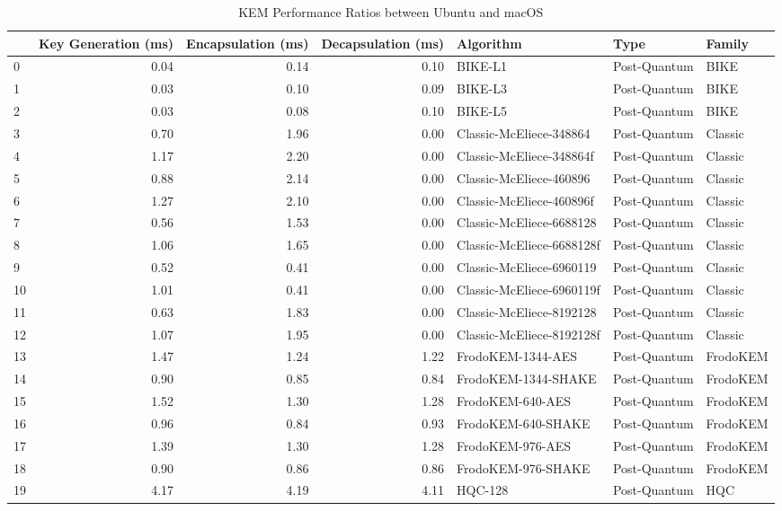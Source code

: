 \begin{table}
\caption{KEM Performance Ratios between Ubuntu and macOS}
\label{tab:desktop_kem_ratio}
\begin{tabular}{lrrrlll}
\toprule
 & Key Generation (ms) & Encapsulation (ms) & Decapsulation (ms) & Algorithm & Type & Family \\
\midrule
0 & 0.04 & 0.14 & 0.10 & BIKE-L1 & Post-Quantum & BIKE \\
1 & 0.03 & 0.10 & 0.09 & BIKE-L3 & Post-Quantum & BIKE \\
2 & 0.03 & 0.08 & 0.10 & BIKE-L5 & Post-Quantum & BIKE \\
3 & 0.70 & 1.96 & 0.00 & Classic-McEliece-348864 & Post-Quantum & Classic \\
4 & 1.17 & 2.20 & 0.00 & Classic-McEliece-348864f & Post-Quantum & Classic \\
5 & 0.88 & 2.14 & 0.00 & Classic-McEliece-460896 & Post-Quantum & Classic \\
6 & 1.27 & 2.10 & 0.00 & Classic-McEliece-460896f & Post-Quantum & Classic \\
7 & 0.56 & 1.53 & 0.00 & Classic-McEliece-6688128 & Post-Quantum & Classic \\
8 & 1.06 & 1.65 & 0.00 & Classic-McEliece-6688128f & Post-Quantum & Classic \\
9 & 0.52 & 0.41 & 0.00 & Classic-McEliece-6960119 & Post-Quantum & Classic \\
10 & 1.01 & 0.41 & 0.00 & Classic-McEliece-6960119f & Post-Quantum & Classic \\
11 & 0.63 & 1.83 & 0.00 & Classic-McEliece-8192128 & Post-Quantum & Classic \\
12 & 1.07 & 1.95 & 0.00 & Classic-McEliece-8192128f & Post-Quantum & Classic \\
13 & 1.47 & 1.24 & 1.22 & FrodoKEM-1344-AES & Post-Quantum & FrodoKEM \\
14 & 0.90 & 0.85 & 0.84 & FrodoKEM-1344-SHAKE & Post-Quantum & FrodoKEM \\
15 & 1.52 & 1.30 & 1.28 & FrodoKEM-640-AES & Post-Quantum & FrodoKEM \\
16 & 0.96 & 0.84 & 0.93 & FrodoKEM-640-SHAKE & Post-Quantum & FrodoKEM \\
17 & 1.39 & 1.30 & 1.28 & FrodoKEM-976-AES & Post-Quantum & FrodoKEM \\
18 & 0.90 & 0.86 & 0.86 & FrodoKEM-976-SHAKE & Post-Quantum & FrodoKEM \\
19 & 4.17 & 4.19 & 4.11 & HQC-128 & Post-Quantum & HQC \\

\end{tabular}
\end{table}
